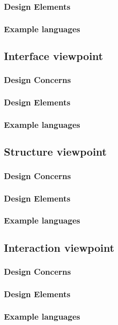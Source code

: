 \documentclass[onecolumn, draftclsnofoot,10pt, compsoc]{IEEEtran}
\begin{document}
\begin{singlespace}
		\subsubsection{Design Elements}
		\subsubsection{Example languages}
	\subsection{Interface viewpoint}
		\subsubsection{Design Concerns}
		\subsubsection{Design Elements}
		\subsubsection{Example languages}
	\subsection{Structure viewpoint}
		\subsubsection{Design Concerns}
		\subsubsection{Design Elements}
		\subsubsection{Example languages}
	\subsection{Interaction viewpoint}
		\subsubsection{Design Concerns}
		\subsubsection{Design Elements}
		\subsubsection{Example languages}

\end{singlespace}
\end{document}
